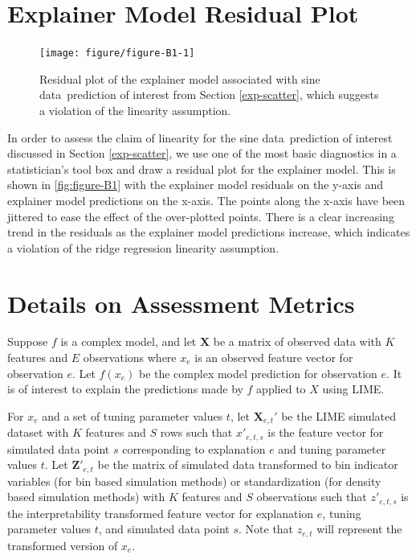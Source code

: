 \documentclass[AMS,STIX2COL]{WileyNJD-v2}\usepackage[]{graphicx}\usepackage[]{color}
\newenvironment{knitrout}{}{} %
\newcommand{\data}{sine data}
\begin{document}
\section{Explainer Model Residual Plot} \label{residual-plot}
\begin{figure}[!h]
\begin{knitrout}
\color{fgcolor}

{\centering \texttt{[image: figure/figure-B1-1]} 

}


\end{knitrout}
\caption{Residual plot of the explainer model associated with \data \ prediction of interest from Section \ref{exp-scatter}, which suggests a violation of the linearity assumption.}
\label{fig:figure-B1}
\end{figure}

In order to assess the claim of linearity for the \data \ prediction of interest discussed in Section \ref{exp-scatter}, we use one of the most basic diagnostics in a statistician's tool box and draw a residual plot for the explainer model. This is shown in \autoref{fig:figure-B1} with the explainer model residuals on the y-axis and explainer model predictions on the x-axis. The points along the x-axis have been jittered to ease the effect of the over-plotted points. There is a clear increasing trend in the residuals as the explainer model predictions increase, which indicates a violation of the ridge regression linearity assumption.

\section{Details on Assessment Metrics} \label{metric-details}

Suppose $f$ is a complex model, and let $\textbf{X}$ be a matrix of observed data with $K$ features and $E$ observations where $x_e$ is an observed feature vector for observation $e$. Let $f(x_e)$ be the complex model prediction for observation $e$. It is of interest to explain the predictions made by $f$ applied to $X$ using LIME. 

For $x_e$ and a set of tuning parameter values $t$, let $\textbf{X}_{e,t}'$ be the LIME simulated dataset with $K$ features and $S$ rows such that $x'_{e,t,s}$ is the feature vector for simulated data point $s$ corresponding to explanation $e$ and tuning parameter values $t$. Let $\textbf{Z}'_{e,t}$ be the matrix of simulated data transformed to bin indicator variables (for bin based simulation methods) or standardization (for density based simulation methods) with $K$ features and $S$ observations such that $z'_{e,t,s}$ is the interpretability transformed feature vector for explanation $e$, tuning parameter values $t$, and simulated data point $s$. Note that $z_{e,t}$ will represent the transformed version of $x_e$.
\end{document}
